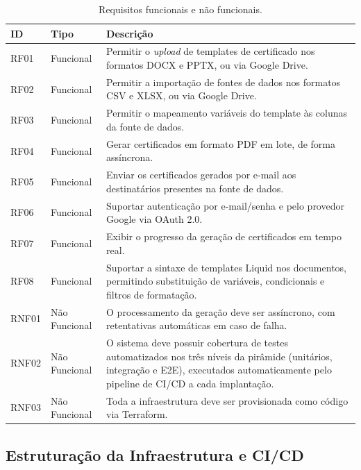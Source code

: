 \documentclass[article,a4paper,12pt,brazil,sumario=tradicional]{abntex2}
\begin{document}
\begin{table}[htbp]
    \centering
    \caption{Requisitos funcionais e não funcionais.}
    \label{tab:requisitos}
    \begin{tabular}{|C{1.5cm}|C{3.2cm}|C{8.3cm}|}
        \hline
        \textbf{ID} & \textbf{Tipo} & \textbf{Descrição} \\
        \hline
        RF01 & Funcional & Permitir o \textit{upload} de templates de certificado nos formatos DOCX e PPTX, ou via Google Drive. \\
        \hline
        RF02 & Funcional & Permitir a importação de fontes de dados nos formatos CSV e XLSX, ou via Google Drive. \\
        \hline
        RF03 & Funcional & Permitir o mapeamento variáveis do template às colunas da fonte de dados. \\
        \hline
        RF04 & Funcional & Gerar certificados em formato PDF em lote, de forma assíncrona. \\
        \hline
        RF05 & Funcional & Enviar os certificados gerados por e-mail aos destinatários presentes na fonte de dados. \\
        \hline
        RF06 & Funcional & Suportar autenticação por e-mail/senha e pelo provedor Google via OAuth 2.0. \\
        \hline
        RF07 & Funcional & Exibir o progresso da geração de certificados em tempo real. \\
        \hline
        RF08 & Funcional & Suportar a sintaxe de templates Liquid nos documentos, permitindo substituição de variáveis, condicionais e filtros de formatação. \\
        \hline
        RNF01 & Não Funcional & O processamento da geração deve ser assíncrono, com retentativas automáticas em caso de falha. \\
        \hline
        RNF02 & Não Funcional & O sistema deve possuir cobertura de testes automatizados nos três níveis da pirâmide (unitários, integração e E2E), executados automaticamente pelo pipeline de CI/CD a cada implantação. \\
        \hline
        RNF03 & Não Funcional & Toda a infraestrutura deve ser provisionada como código via Terraform. \\
        \hline
    \end{tabular}

\end{table}

\subsection{Estruturação da Infraestrutura e CI/CD}
\end{document}

